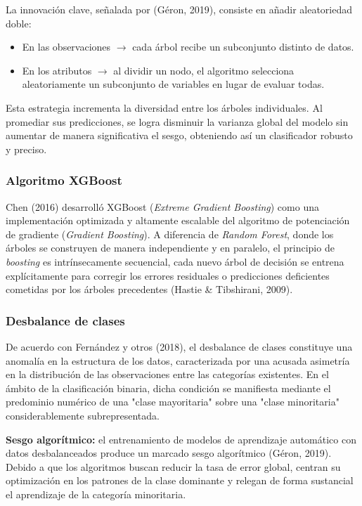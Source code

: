 \documentclass[11pt,oneside,openany]{book}
\begin{document}
La innovación clave, señalada por (Géron, 2019), consiste en añadir aleatoriedad doble:

\begin{itemize}[leftmargin=*]
\item En las observaciones \(\rightarrow\) cada árbol recibe un subconjunto distinto de datos.
\item En los atributos \(\rightarrow\) al dividir un nodo, el algoritmo selecciona aleatoriamente un subconjunto de variables en lugar de evaluar todas.
\end{itemize}
Esta estrategia incrementa la diversidad entre los árboles individuales. Al promediar sus predicciones, se logra disminuir la varianza global del modelo sin aumentar de manera significativa el sesgo, obteniendo así un clasificador robusto y preciso.

\subsubsection*{Algoritmo XGBoost}

Chen (2016) desarrolló XGBoost (\emph{Extreme Gradient Boosting}) como una implementación optimizada y altamente escalable del algoritmo de potenciación de gradiente (\emph{Gradient Boosting}). A diferencia de \emph{Random Forest}, donde los árboles se construyen de manera independiente y en paralelo, el principio de \emph{boosting} es intrínsecamente secuencial, cada nuevo árbol de decisión se entrena explícitamente para corregir los errores residuales o predicciones deficientes cometidas por los árboles precedentes (Hastie \& Tibshirani, 2009).

\subsubsection*{Desbalance de clases}

De acuerdo con Fernández y otros (2018), el desbalance de clases constituye una anomalía en la estructura de los datos, caracterizada por una acusada asimetría en la distribución de las observaciones entre las categorías existentes. En el ámbito de la clasificación binaria, dicha condición se manifiesta mediante el predominio numérico de una "clase mayoritaria" sobre una "clase minoritaria" considerablemente subrepresentada.

\textbf{Sesgo algorítmico:} el entrenamiento de modelos de aprendizaje automático con datos desbalanceados produce un marcado sesgo algorítmico (Géron, 2019). Debido a que los algoritmos buscan reducir la tasa de error global, centran su optimización en los patrones de la clase dominante y relegan de forma sustancial el aprendizaje de la categoría minoritaria.
\end{document}
